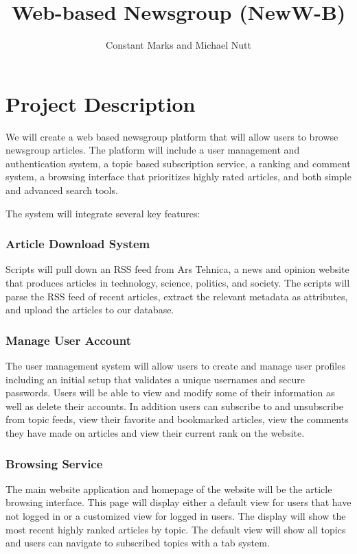 \documentclass{report}
\title{Web-based Newsgroup (NewW-B)}
\author{Constant Marks and Michael Nutt}
\begin{document}
\maketitle

\section*{Project Description}
We will create a web based newsgroup platform that will allow users to browse newsgroup articles. The platform will include a user management and authentication system, a topic based subscription service, a ranking and comment system, a browsing interface that prioritizes highly rated articles, and both simple and advanced search tools.

The system will integrate several key features:

\subsubsection*{Article Download System}
Scripts will pull down an RSS feed from Ars Tehnica, a news and opinion website that produces articles in technology, science, politics, and society.  The scripts will parse the RSS feed of recent articles, extract the relevant metadata as attributes, and upload the articles to our database. 

\subsubsection*{Manage User Account}
The user management system will allow users to create and manage user profiles including an initial setup that validates a unique usernames and secure passwords.  Users will be able to view and modify some of their information as well as delete their accounts. In addition users can subscribe to and unsubscribe from topic feeds,  view their favorite and bookmarked articles, view the comments they have made on articles and view their current rank on the website. 

\subsubsection*{Browsing Service}
The main website application and homepage of the website will be the article browsing interface.  This page will display either a default view for users that have not logged in or a customized view for logged in users. The display will show the most recent highly ranked articles by topic.  The default view will show all topics and users can navigate to subscribed topics with a tab system.
\end{document}

